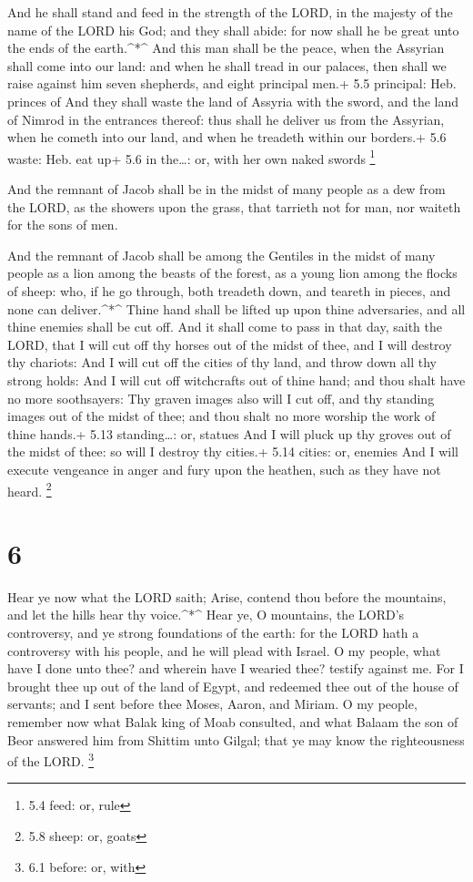  And he shall stand and feed in the strength of the LORD, in
the majesty of the name of the LORD his God; and they shall abide: for
now shall he be great unto the ends of the earth.\^{}*\^{} 
And this man shall be the peace, when the Assyrian shall come into our
land: and when he shall tread in our palaces, then shall we raise
against him seven shepherds, and eight principal men.+ 5.5 principal:
Heb. princes of  And they shall waste the land of Assyria
with the sword, and the land of Nimrod in the entrances thereof: thus
shall he deliver us from the Assyrian, when he cometh into our land, and
when he treadeth within our borders.+ 5.6 waste: Heb. eat up+ 5.6 in
the\ldots: or, with her own naked swords \footnote{5.4 feed: or, rule}

 And the remnant of Jacob shall be in the midst of many
people as a dew from the LORD, as the showers upon the grass, that
tarrieth not for man, nor waiteth for the sons of men.

 And the remnant of Jacob shall be among the Gentiles in the
midst of many people as a lion among the beasts of the forest, as a
young lion among the flocks of sheep: who, if he go through, both
treadeth down, and teareth in pieces, and none can deliver.\^{}*\^{}
 Thine hand shall be lifted up upon thine adversaries, and
all thine enemies shall be cut off.  And it shall come to
pass in that day, saith the LORD, that I will cut off thy horses out of
the midst of thee, and I will destroy thy chariots:  And I
will cut off the cities of thy land, and throw down all thy strong
holds:  And I will cut off witchcrafts out of thine hand;
and thou shalt have no more soothsayers:  Thy graven images
also will I cut off, and thy standing images out of the midst of thee;
and thou shalt no more worship the work of thine hands.+ 5.13
standing\ldots: or, statues  And I will pluck up thy groves
out of the midst of thee: so will I destroy thy cities.+ 5.14 cities:
or, enemies  And I will execute vengeance in anger and fury
upon the heathen, such as they have not heard. \footnote{5.8 sheep: or,
  goats}

\hypertarget{section-5}{%
\section{6}\label{section-5}}

 Hear ye now what the LORD saith; Arise, contend thou before
the mountains, and let the hills hear thy voice.\^{}*\^{} 
Hear ye, O mountains, the LORD's controversy, and ye strong foundations
of the earth: for the LORD hath a controversy with his people, and he
will plead with Israel.  O my people, what have I done unto
thee? and wherein have I wearied thee? testify against me. 
For I brought thee up out of the land of Egypt, and redeemed thee out of
the house of servants; and I sent before thee Moses, Aaron, and Miriam.
 O my people, remember now what Balak king of Moab
consulted, and what Balaam the son of Beor answered him from Shittim
unto Gilgal; that ye may know the righteousness of the LORD. \footnote{6.1
  before: or, with}

